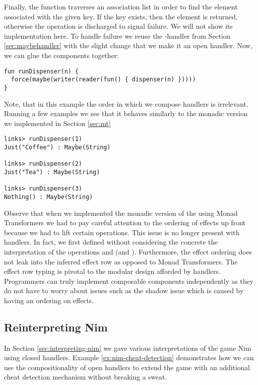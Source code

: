 \begin{example}
Finally, the  function traverses an association list in order to find the element associated with the given key. If the key exists, then the element is returned, otherwise the  operation is discharged to signal failure. We will not show its implementation here.
To handle failure we reuse the -handler from Section \ref{sec:maybehandler} with the slight change that we make it an open handler. Now, we can glue the components together:
\begin{lstlisting}[style=links]
fun runDispenser(n) {
  force(maybe(writer(reader(fun() { dispenser(n) }))))
}
\end{lstlisting}
Note, that in this example the order in which we compose handlers is irrelevant.
Running a few examples we see that it behaves similarly to the monadic version we implemented in Section \ref{sec:mt}
\begin{lstlisting}[style=links]
links> runDispenser(1)
Just("Coffee") : Maybe(String)

links> runDispenser(2)
Just("Tea") : Maybe(String)

links> runDispenser(3)
Nothing() : Maybe(String)
\end{lstlisting}
\end{example}
Observe that when we implemented the monadic version of the  using Monad Transformers we had to pay careful attention to the ordering of effects up front because we had to lift certain operations. This issue is no longer present with handlers. In fact, we first defined  without considering the concrete the interpretation of the operations  and  (and ). Furthermore, the effect ordering does not leak into the inferred effect row as opposed to Monad Transformers. The effect row typing is pivotal to the modular design afforded by handlers. Programmers can truly implement composable components independently as they do not have to worry about issues such as the shadow issue which is caused by having an ordering on effects.

\subsection{Reinterpreting Nim}\label{sec:reinterpreting-nim}
In Section \ref{sec:interpreting-nim} we gave various interpretations of the game Nim using closed handlers. Example \ref{ex:nim-cheat-detection} demonstrates how we can use the compositionality of open handlers to extend the game with an additional cheat detection mechanism without breaking a sweat.


